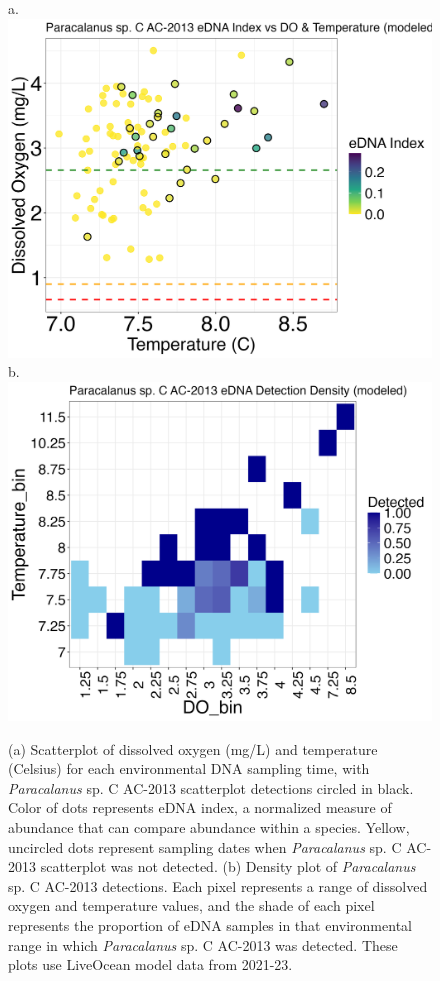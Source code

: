 \documentclass[12pt,twoside]{reedthesis}
\begin{document}
{	
	\begin{figure}[!h]
		\begin{center}
			a. \includegraphics[scale=0.3]{Paracalanus_Scatter_AllYr_mod_noOut} 
			b. \includegraphics[scale=0.3]{Paracalanus_Density_AllYr_mod} 
			\caption[\textit{Paracalanus} sp. C AC-2013 scatterplot and density plot]{\footnotesize{(a) Scatterplot of dissolved oxygen (mg/L) and temperature (Celsius) for each environmental DNA sampling time, with \textit{Paracalanus} sp. C AC-2013 scatterplot detections circled in black. Color of dots represents eDNA index, a normalized measure of abundance that can compare abundance within a species. Yellow, uncircled dots represent sampling dates when \textit{Paracalanus} sp. C AC-2013 scatterplot was not detected. (b) Density plot of \textit{Paracalanus} sp. C AC-2013 detections. Each pixel represents a range of dissolved oxygen and temperature values, and the shade of each pixel represents the proportion of eDNA samples in that environmental range in which \textit{Paracalanus} sp. C AC-2013 was detected. These plots use LiveOcean model data from 2021-23.}} %
			\label{ParacalanusScatter}
		\end{center}
	\end{figure} 
	
}
\end{document}
